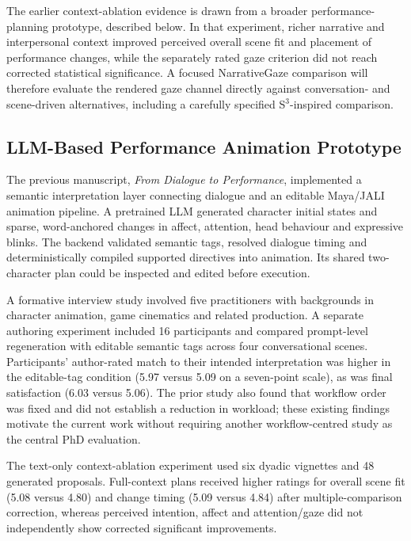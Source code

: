 \documentclass[11pt,a4paper]{article}
\begin{document}
The earlier context-ablation evidence is drawn from a broader performance-planning prototype, described below. In that experiment, richer narrative and interpersonal context improved perceived overall scene fit and placement of performance changes, while the separately rated gaze criterion did not reach corrected statistical significance. A focused NarrativeGaze comparison will therefore evaluate the rendered gaze channel directly against conversation- and scene-driven alternatives, including a carefully specified S$^3$-inspired comparison.

\subsection{LLM-Based Performance Animation Prototype}

The previous manuscript, \emph{From Dialogue to Performance}, implemented a semantic interpretation layer connecting dialogue and an editable Maya/JALI animation pipeline. A pretrained LLM generated character initial states and sparse, word-anchored changes in affect, attention, head behaviour and expressive blinks. The backend validated semantic tags, resolved dialogue timing and deterministically compiled supported directives into animation. Its shared two-character plan could be inspected and edited before execution.

A formative interview study involved five practitioners with backgrounds in character animation, game cinematics and related production. A separate authoring experiment included 16 participants and compared prompt-level regeneration with editable semantic tags across four conversational scenes. Participants' author-rated match to their intended interpretation was higher in the editable-tag condition (5.97 versus 5.09 on a seven-point scale), as was final satisfaction (6.03 versus 5.06). The prior study also found that workflow order was fixed and did not establish a reduction in workload; these existing findings motivate the current work without requiring another workflow-centred study as the central PhD evaluation.

The text-only context-ablation experiment used six dyadic vignettes and 48 generated proposals. Full-context plans received higher ratings for overall scene fit (5.08 versus 4.80) and change timing (5.09 versus 4.84) after multiple-comparison correction, whereas perceived intention, affect and attention/gaze did not independently show corrected significant improvements.
\end{document}
